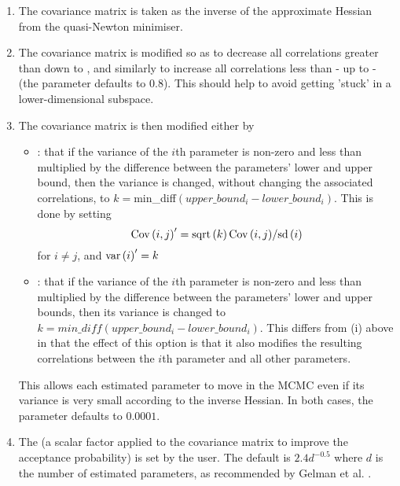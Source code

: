 \begin{enumerate}
\item The covariance matrix is taken as the inverse of the approximate Hessian from the quasi-Newton minimiser.

\item The covariance matrix is modified so as to decrease all correlations greater than  down to , and similarly to increase all correlations less than - up to - (the  parameter defaults to 0.8). This should help to avoid getting 'stuck' in a lower-dimensional subspace.

\item The covariance matrix is then modified either by

\begin{itemize}
\item  {}: that if the variance of the $i$th parameter is non-zero and less than  multiplied by the difference between the parameters' lower and upper bound, then the variance is changed, without changing the associated correlations, to $k=$min\_diff$(upper\_bound_i-lower\_bound_i)$. This is done by setting \[
{\mathop{\rm Cov}\nolimits} \left( {i,j} \right)^\prime   = {{{\mathop{\rm sqrt}\nolimits} \left( k \right){\mathop{\rm Cov}\nolimits} \left( {i,j} \right)} \mathord{\left/
{\vphantom {{{\mathop{\rm sqrt}\nolimits} \left( k \right){\mathop{\rm Cov}\nolimits} \left( {i,j} \right)} {{\mathop{\rm sd}\nolimits} \left( i \right)}}} \right.
\kern-\nulldelimiterspace} {{\mathop{\rm sd}\nolimits} \left( i \right)}}
\]
for $i \ne j$, and ${\mathop{\rm var}} \left( i \right)^\prime   = k$

\item {}: that if the variance of the $i$th parameter is non-zero and less than  multiplied by the difference between the parameters' lower and upper bounds, then its variance is changed to $k=min\_diff(upper\_bound_i-lower\_bound_i)$. This differs from (i) above in that the effect of this option is that it also modifies the resulting correlations between the $i$th parameter and all other parameters.
\end{itemize}

This allows each estimated parameter to move in the MCMC even if its variance is very small according to the inverse Hessian. In both cases, the  parameter defaults to $0.0001$.

\item The  (a scalar factor applied to the covariance matrix to improve the acceptance probability) is set by the user. The default is $2.4d^{-0.5}$ where $d$ is the number of estimated parameters, as recommended by Gelman et al. \citep{823}.
\end{enumerate}

